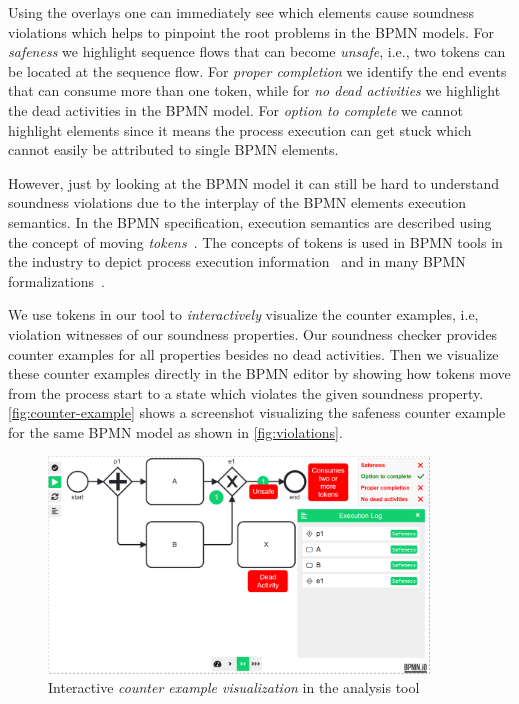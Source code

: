 \documentclass[runningheads]{llncs}
\begin{document}
Using the overlays one can immediately see which elements cause soundness violations which helps to pinpoint the root problems in the BPMN models.
For \textit{safeness} we highlight sequence flows that can become \textit{unsafe}, i.e., two tokens can be located at the sequence flow.
For \textit{proper completion} we identify the end events that can consume more than one token, while for \textit{no dead activities} we highlight the dead activities in the BPMN model.
For \textit{option to complete} we cannot highlight elements since it means the process execution can get stuck which cannot easily be attributed to single BPMN elements.

However, just by looking at the BPMN model it can still be hard to understand soundness violations due to the interplay of the BPMN elements execution semantics.
In the BPMN specification, execution semantics are described using the concept of moving \textit{tokens}~\cite{objectmanagementgroupBusinessProcessModel2013}.
The concepts of tokens is used in BPMN tools in the industry to depict process execution information~\cite{camundaservicesgmbhBpmnjsTokenSimulation2024} and in many BPMN formalizations~\cite{vangorpVisualTokenbasedFormalization2013,krauterFormalizationAnalysisBPMN2023,houhouFirstOrderLogicVerification2022,corradiniFormalisingAnimatingMultiple2022}.

We use tokens in our tool to \textit{interactively} visualize the counter examples, i.e, violation witnesses of our soundness properties.
Our soundness checker provides counter examples for all properties besides no dead activities.
Then we visualize these counter examples directly in the BPMN editor by showing how tokens move from the process start to a state which violates the given soundness property.
\autoref{fig:counter-example} shows a screenshot visualizing the safeness counter example for the same BPMN model as shown in \autoref{fig:violations}.

\begin{figure}[ht]
	\centering
	\includegraphics[width=0.9\textwidth]{images/counter-example}
	\caption{Interactive \textit{counter example visualization} in the analysis tool}
	\label{fig:counter-example}
\end{figure}
\end{document}

